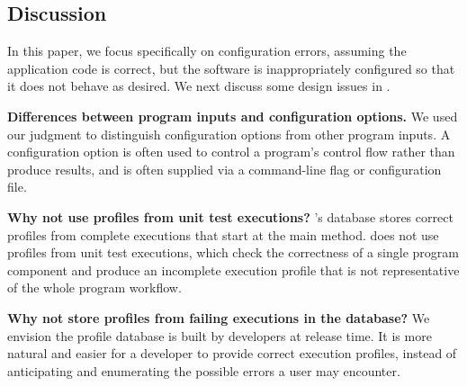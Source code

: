 \subsection{Discussion}

In this paper, we focus specifically on configuration errors,
assuming the application code is correct, but the software		
is inappropriately configured so that it does not		
behave as desired. We next discuss some design issues in \ourtool.

\vspace{0.5mm}
\noindent \textbf{Differences between program inputs and configuration options.}
We used our judgment to distinguish configuration options 
from other program inputs. A configuration option is
often used to control a program's control flow rather
than produce results, and is often supplied via a command-line
flag or configuration file.



\vspace{0.5mm}
\noindent \textbf{Why not use profiles from unit test executions?}
\ourtool's database stores correct profiles from complete 
executions that start at the main method.
\ourtool does not use profiles from unit test executions, which check the
correctness
of a single program component and produce
an incomplete execution profile that is not representative of
the whole program workflow. 



\vspace{0.5mm}
\noindent \textbf{Why not store profiles from failing executions in the database?}
We envision the profile database is built by developers at release time.
It is more natural and easier for a developer to provide correct execution
profiles, instead of anticipating and enumerating the possible
errors a user may encounter.

